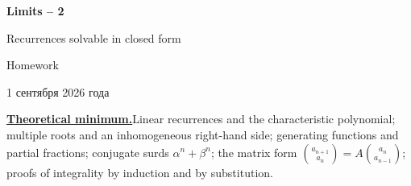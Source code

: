 \documentclass[11pt,a4paper]{article}
\begin{document}
\begin{center}
{\huge\bfseries Limits -- 2\par}\vspace{0.7em}
{\Large Recurrences solvable in closed form\par}\vspace{0.7em}
{\Large Homework\par}\vspace{0.7em}
{\foreignlanguage{russian}{1 сентября 2026 года}\par}
\end{center}\vspace{-1pt}

\noindent\textbf{\underline{Theoretical minimum.}}\quad Linear recurrences and the characteristic
polynomial; multiple roots and an inhomogeneous right-hand side; generating functions and partial
fractions; conjugate surds $\alpha^n+\beta^n$; the matrix form
$\binom{a_{n+1}}{a_n}=A\binom{a_n}{a_{n-1}}$; proofs of integrality by induction and by
substitution.
\end{document}
